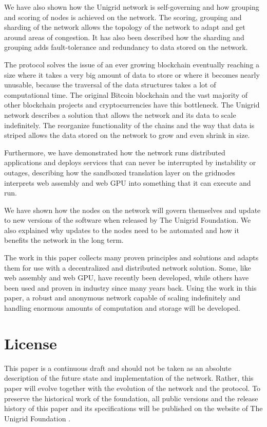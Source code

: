 \documentclass[10pt,a4paper,final]{article}
\begin{document}
We have also shown how the Unigrid network is self-governing and how grouping and scoring of nodes is achieved on the network. The scoring, grouping and sharding of the network allows the topology of the network to adapt and get around areas of congestion. It has also been described how the sharding and grouping adds fault-tolerance and redundancy to data stored on the network.

The protocol solves the issue of an ever growing blockchain eventually reaching a size where it takes a very big amount of data to store or where it becomes nearly unusable, because the traversal of the data structures takes a lot of computational time. The original Bitcoin blockchain and the vast majority of other blockchain projects and cryptocurrencies have this bottleneck. The Unigrid network describes a solution that allows the network and its data to scale indefinitely. The reorganize functionality of the chains and the way that data is striped allows the data stored on the network to grow and even shrink in size.

Furthermore, we have demonstrated how the network runs distributed applications and deploys services that can never be interrupted by instability or outages, describing how the sandboxed translation layer on the \glspl{gridnode} interprets web assembly and web GPU into something that it can execute and run.

We have shown how the nodes on the network will govern themselves and update to new versions of the software when released by The Unigrid Foundation. We also explained why updates to the nodes need to be automated and how it benefits the network in the long term.

The work in this paper collects many proven principles and solutions and adapts them for use with a decentralized and distributed network solution. Some, like web assembly and web GPU, have recently been developed, while others have been used and proven in industry since many years back. Using the work in this paper, a robust and anonymous network capable of scaling indefinitely and handling enormous amounts of computation and storage will be developed.

\newpage
\section{License}
This paper is a continuous draft and should not be taken as an absolute description of the future state and implementation of the network. Rather, this paper will evolve together with the evolution of the network and the protocol. To preserve the historical work of the foundation, all public versions and the release history of this paper and its specifications will be published on the website of The Unigrid Foundation \cite{unigrid}.
\end{document}
